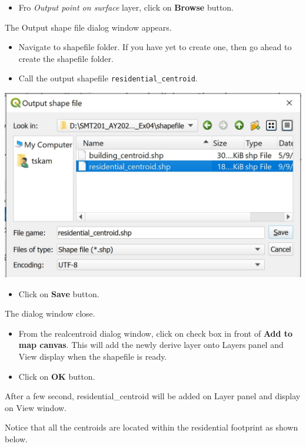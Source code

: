 \documentclass[
  letterpaper,
  DIV=11,
  numbers=noendperiod]{scrreprt}
\providecommand{\tightlist}{%
  \setlength{\itemsep}{0pt}\setlength{\parskip}{0pt}}\usepackage{longtable,booktabs,array}
\begin{document}
\begin{itemize}
\tightlist
\item
  Fro \emph{Output point on surface} layer, click on \textbf{Browse}
  button.
\end{itemize}

The Output shape file dialog window appears.

\begin{itemize}
\item
  Navigate to shapefile folder. If you have yet to create one, then go
  ahead to create the shapefile folder.
\item
  Call the output shapefile \texttt{residential\_centroid}.
\end{itemize}

\includegraphics{./img04/image114.jpg}

\begin{itemize}
\tightlist
\item
  Click on \textbf{Save} button.
\end{itemize}

The dialog window close.

\begin{itemize}
\item
  From the realcentroid dialog window, click on check box in front of
  \textbf{Add to map canvas}. This will add the newly derive layer onto
  Layers panel and View display when the shapefile is ready.
\item
  Click on \textbf{OK} button.
\end{itemize}

After a few second, residential\_centroid will be added on Layer panel
and display on View window.

Notice that all the centroids are located within the residential
footprint as shown below.
\end{document}
